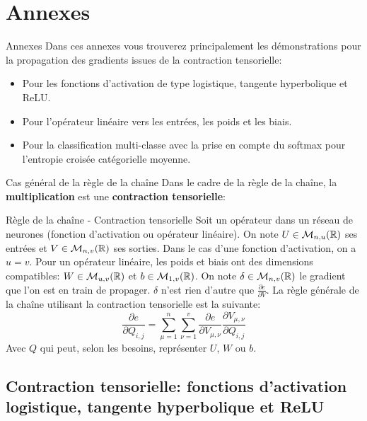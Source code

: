 \section[Annexes]{Annexes}

\begin{frame}{Annexes}
	Dans ces annexes vous trouverez principalement les démonstrations pour la propagation des gradients issues de la contraction tensorielle:
	\begin{itemize}
		\item Pour les fonctions d'activation de type logistique, tangente hyperbolique et ReLU.
		\item Pour l'opérateur linéaire vers les entrées, les poids et les biais.
		\item Pour la classification multi-classe avec la prise en compte du softmax pour l'entropie croisée catégorielle moyenne.
	\end{itemize}
\end{frame}

\begin{frame}{Cas général de la règle de la chaîne}
	Dans le cadre de la règle de la chaîne, la \textbf{multiplication} est une \textbf{contraction tensorielle}:
	
	\begin{block}{Règle de la chaîne - Contraction tensorielle}
		Soit un opérateur dans un réseau de neurones (fonction d'activation ou opérateur linéaire). On note $U \in \mathcal{M}_{n, u}(\mathbb{R})$ ses entrées et $V \in \mathcal{M}_{n, v}(\mathbb{R})$ ses sorties. Dans le cas d'une fonction d'activation, on a $u = v$. Pour un opérateur linéaire, les poids et biais ont des dimensions compatibles: $W \in \mathcal{M}_{u, v}(\mathbb{R})$ et $b \in \mathcal{M}_{1, v}(\mathbb{R})$. On note $\delta \in \mathcal{M}_{n, v}(\mathbb{R})$ le gradient que l'on est en train de propager. $\delta$ n'est rien d'autre que $\frac{\partial{e}}{\partial{V}}$.
		La règle générale de la chaîne utilisant la contraction tensorielle est la suivante:
		\begin{equation*}
			\frac{\partial{e}}{\partial{Q_{i,j}}} = \sum_{\mu=1}^n \sum_{\nu=1}^v \frac{\partial{e}}{\partial{V_{\mu,\nu}}} \frac{\partial{V_{\mu,\nu}}}{\partial{Q_{i,j}}}
		\end{equation*}
		Avec $Q$ qui peut, selon les besoins, représenter $U$, $W$ ou $b$.
	\end{block}
\end{frame}

\subsection{Contraction tensorielle: fonctions d'activation logistique, tangente hyperbolique et ReLU}

